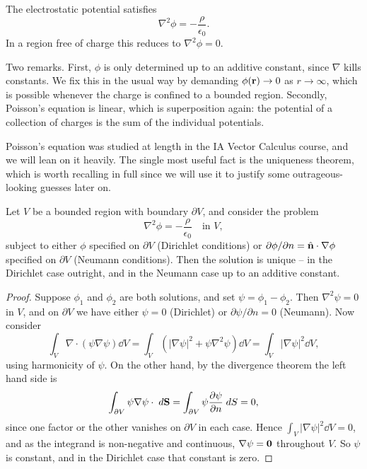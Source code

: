\documentclass[a4paper]{scrartcl}
\newcommand{\hh}[1]{\hat{\vv{#1}}}
\begin{document}
\begin{proposition}
	The electrostatic potential satisfies
	$$
	\nabla^2 \phi = -\frac{\rho}{\epsilon_0}.
	$$
	In a region free of charge this reduces to  $\nabla^2 \phi = 0$.
\end{proposition}

Two remarks. First, $\phi$ is only determined up to an additive constant, since $\nabla$ kills constants. We fix this in the usual way by demanding $\phi(\mathbf{r}) \to 0$ as $r \to \infty$, which is possible whenever the charge is confined to a bounded region. Secondly, Poisson's equation is linear, which is superposition again: the potential of a collection of charges is the sum of the individual potentials.

Poisson's equation was studied at length in the IA Vector Calculus course, and we will lean on it heavily. The single most useful fact is the uniqueness theorem, which is worth recalling in full since we will use it to justify some outrageous-looking guesses later on.

\begin{theorem}
	\label{em-thm:uniqueness}
	Let $V$ be a bounded region with boundary $\partial V$, and consider the problem
	$$
	\nabla^2 \phi = -\frac{\rho}{\epsilon_0} \quad \text{in } V,
	$$
	subject to either $\phi$ specified on $\partial V$ (Dirichlet conditions) or $\partial \phi/\partial n = \hh{n}\cdot\nabla\phi$ specified on $\partial V$ (Neumann conditions). Then the solution is unique -- in the Dirichlet case outright, and in the Neumann case up to an additive constant.
\end{theorem}
\begin{proof}
	Suppose $\phi_1$ and $\phi_2$ are both solutions, and set $\psi = \phi_1 - \phi_2$. Then $\nabla^2 \psi = 0$ in $V$, and on $\partial V$ we have either $\psi = 0$ (Dirichlet) or $\partial \psi/\partial n = 0$ (Neumann). Now consider
	$$
	\int_V \nabla\cdot(\psi \nabla \psi)\dd V = \int_V \left(|\nabla \psi|^2 + \psi \nabla^2 \psi\right)\dd V = \int_V |\nabla\psi|^2 \dd V,
	$$
	using harmonicity of $\psi$. On the other hand, by the divergence theorem the left hand side is
	$$
	\int_{\partial V} \psi \nabla \psi \cdot \; d \mathbf{S} = \int_{\partial V}\psi \frac{\partial \psi}{\partial n}\; d S = 0,
	$$
	since one factor or the other vanishes on $\partial V$ in each case. Hence $\int_V |\nabla\psi|^2 \dd V = 0$, and as the integrand is non-negative and continuous, $\nabla \psi = \mathbf{0}$ throughout $V$. So $\psi$ is constant, and in the Dirichlet case that constant is zero.
\end{proof}
\end{document}
